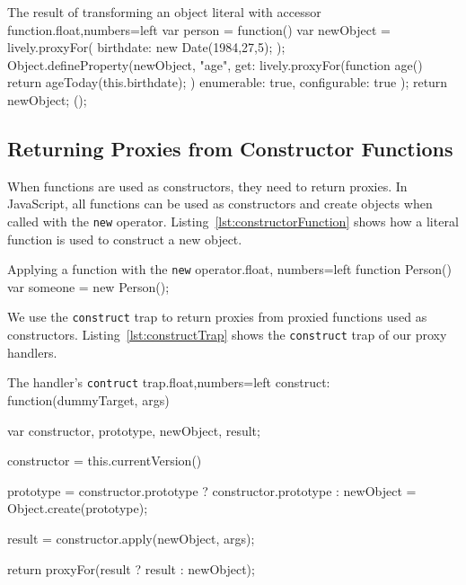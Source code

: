 \begin{code}{The result of transforming an object literal with accessor function.}{float,numbers=left}
var person = function() {
    var newObject = lively.proxyFor({
        birthdate: new Date(1984,27,5);
    });
    Object.defineProperty(newObject, "age", {
        get: lively.proxyFor(function age() {
            return ageToday(this.birthdate);
        })
        enumerable: true,
        configurable: true
    });
    return newObject;
}();
\end{code}
\iffalse
\end{verbatim}\fi



\subsection{Returning Proxies from Constructor Functions} 

When functions are used as constructors, they need to return proxies.
In JavaScript, all functions can be used as constructors and create objects when called with the \lstinline{new} operator.
Listing~\ref{lst:constructorFunction} shows how a literal function is used to construct a new object.

\begin{code}{Applying a function with the \lstinline{new} operator.}{float, numbers=left}
function Person() {}
var someone = new Person();
\end{code}
\iffalse
\end{verbatim}\fi

We use the \lstinline{construct} trap to return proxies from proxied functions used as constructors.
Listing~\ref{lst:constructTrap} shows the \lstinline{construct} trap of our proxy handlers.

\begin{code}{The handler's \lstinline{contruct} trap.}{float,numbers=left}
construct: function(dummyTarget, args) {
    var constructor, prototype, newObject, result;
    
    constructor = this.currentVersion()
    
    prototype = constructor.prototype ? constructor.prototype : {}    
    newObject = Object.create(prototype);
    
    result = constructor.apply(newObject, args);
    
    return proxyFor(result ? result : newObject);
}
\end{code}
\iffalse
\end{verbatim}\fi

